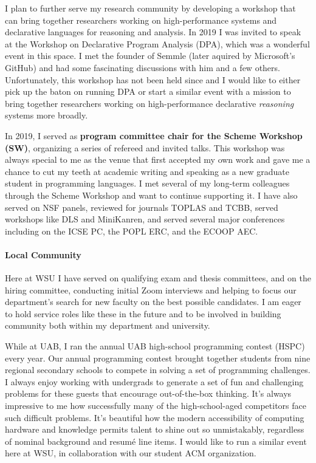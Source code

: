 \documentclass[12pt]{article}
\begin{document}
I plan to further serve my research community by developing a workshop that can bring together researchers working on high-performance systems and declarative languages for reasoning and analysis. In 2019 I was invited to speak at the Workshop on Declarative Program Analysis (DPA), which was a wonderful event in this space. I met the founder of Semmle (later aquired by Microsoft's GitHub) and had some fascinating discussions with him and a few others. Unfortunately, this workshop has not been held since and I would like to either pick up the baton on running DPA or start a similar event with a mission to bring together researchers working on high-performance declarative \emph{reasoning} systems more broadly.

In 2019, I served as \textbf{program committee chair for the Scheme Workshop (SW)}, organizing a series of refereed and invited talks. This workshop was always special to me as the venue that first accepted my own work and gave me a chance to cut my teeth at academic writing and speaking as a new graduate student in programming languages. I met several of my long-term colleagues through the Scheme Workshop and want to continue supporting it.
I have also served on NSF panels, reviewed for journals TOPLAS and TCBB, served workshops like DLS and MiniKanren, and served several major conferences including on the ICSE PC, the POPL ERC, and the ECOOP AEC. 

\paragraph{Local Community}

Here at WSU I have served on qualifying exam and thesis committees, and on the hiring committee, conducting initial Zoom interviews and helping to focus our department's search for new faculty on the best possible candidates.
I am eager to hold service roles like these in the future and to be involved in building community both within my department and university. 

While at UAB, I ran the annual UAB high-school programming contest (HSPC) every year.
Our annual programming contest brought together students from nine regional secondary schools to compete in solving a set of programming challenges. I always enjoy working with undergrads to generate a set of fun and challenging problems for these guests that encourage out-of-the-box thinking. It's always impressive to me how successfully many of the high-school-aged competitors face such difficult problems. It's beautiful how the modern accessibility of computing hardware and knowledge permits talent to shine out so unmistakably, regardless of nominal background and resum\'e line items. I would like to run a similar event here at WSU, in collaboration with our student ACM organization.
\end{document}

